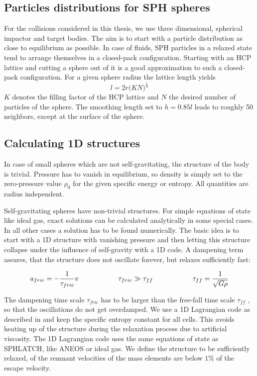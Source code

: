 \subsection{Particles distributions for SPH spheres}
For the collisions considered in this thesis, we use three dimensional, spherical impactor and target bodies. The aim is to start with a particle distribution as close to equilibrium as possible. In case of fluids, SPH particles in a relaxed state tend to arrange themselves in a closed-pack configuration. Starting with an HCP lattice and cutting a sphere out of it is a good approximation to such a closed-pack configuration. For a given sphere radius the lattice length yields
\begin{equation}
\label{ch02_aux_eq001}
l = 2 r \big( K N \big)^{\frac{1}{3}}
\end{equation}
$K$ denotes the filling factor of the HCP lattice and $N$ the desired number of particles of the sphere. The smoothing length set to $h = 0.85 l$ leads to roughly 50 neighbors, except at the surface of the sphere.

\subsection{Calculating 1D structures}
\label{ch02_sec04_ss02}
In case of small spheres which are not self-gravitating, the structure of the body is trivial. Pressure has to vanish in equilibrium, so density is simply set to the zero-pressure value $\rho_0$ for the given specific energy or entropy. All quantities are radius independent.

Self-gravitating spheres have non-trivial structures. For simple equations of state like ideal gas, exact solutions can be calculated analytically in some special cases. In all other cases a solution has to be found numerically. The basic idea is to start with a 1D structure with vanishing pressure and then letting this structure collapse under the influence of self-gravity with a 1D code. A dampening term assures, that the structure does not oscillate forever, but relaxes sufficiently fast:

\begin{equation}
\label{ch02_aux_eq002}
a_{fric} = - \frac{1}{\tau_{fric}} v \hspace{2.0cm} \tau_{fric} \gg \tau_{ff}\hspace{2.0cm} \tau_{ff} = \frac{1}{\sqrt{G \rho} }
\end{equation}

The dampening time scale $\tau_{fric}$ has to be larger than the free-fall time scale $\tau_{ff}$ \citep{shore2007astrophysical}, so that the oscillations do not get overdamped. We use a 1D Lagrangian code as described in \citep{Benz:1991p700} and keep the specific entropy constant for all cells. This avoids heating up of the structure during the relaxation process due to artificial viscosity. The 1D Lagrangian code uses the same equations of state as SPHLATCH, like ANEOS or ideal gas. We define the structure to be sufficiently relaxed, of the remnant velocities of the mass elements are below $1\%$ of the escape velocity. 

